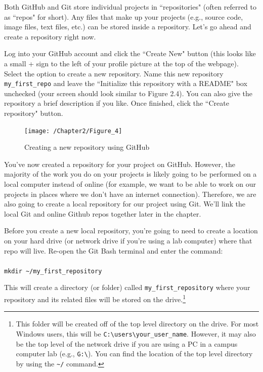 \documentclass{book}
\begin{document}
Both GitHub and Git store individual projects in ``repositories" (often referred to as ``repos" for short). Any files that make up your projects (e.g., source code, image files, text files, etc.) can be stored inside a repository. Let's go ahead and create a repository right now. 

Log into your GitHub account and click the ``Create New" button (this looks like a small + sign to the left of your profile picture at the top of the webpage). Select the option to create a new repository. Name this new repository \texttt{my\_first\_repo} and leave the ``Initialize this repository with a README" box unchecked (your screen should look similar to Figure 2.4). You can also give the repository a brief description if you like. Once finished, click the ``Create repository" button. 

\begin{figure}[h]
	\caption{Creating a new repository using GitHub}
	\centering\texttt{[image: /Chapter2/Figure\_4]}
\end{figure}

You've now created a repository for your project on GitHub. However, the majority of the work you do on your projects is likely going to be performed on a local computer instead of online (for example, we want to be able to work on our projects in places where we don't have an internet connection). Therefore, we are also going to create a local repository for our project using Git. We'll link the local Git and online Github repos together later in the chapter.

Before you create a new local repository, you're going to need to create a location on your hard drive (or network drive if you're using a lab computer) where that repo will live. Re-open the Git Bash terminal and enter the command: \\ \\ \texttt{mkdir \textasciitilde/my\_first\_repository}
 
This will create a directory (or folder) called \texttt{my\_first\_repository} where your repository and its related files will be stored on the drive.\footnote{This folder will be created off of the top level directory on the drive. For most Windows users, this will be \texttt{C:\textbackslash users\textbackslash your\_user\_name}. However, it may also be the top level of the network drive if you are using a PC in a campus computer lab (e.g., \texttt{G:\textbackslash}). You can find the location of the top level directory by using the \texttt{\textasciitilde/} command.}
\end{document}

